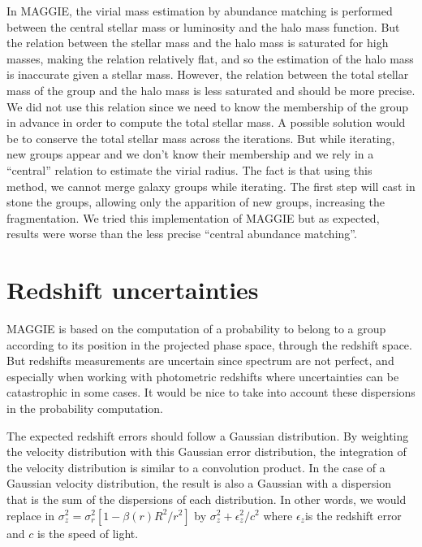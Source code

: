 In MAGGIE, the virial mass estimation by abundance matching is performed
between the central stellar mass or luminosity and the halo mass function. But
the relation between the stellar mass and the halo mass is saturated for high
masses, making the relation relatively flat, and so the estimation of the halo
mass is inaccurate given a stellar mass. However, the relation between the
total stellar mass of the group and the halo mass is less saturated and should
be more precise. We did not use this relation since we need to know the
membership of the group in advance in order to compute the total stellar mass.
A possible solution would be to conserve the total stellar mass across the
iterations. But while iterating, new groups appear and we don't know their
membership and we rely in a ``central'' relation to estimate the virial radius.
The fact is that using this method, we cannot merge galaxy groups while
iterating. The first step will cast in stone the groups, allowing only
the apparition of new groups, increasing the fragmentation. We tried this
implementation of MAGGIE but as expected, results were worse than the less
precise ``central abundance matching''.

\section{Redshift uncertainties}
\label{sec:redshift_uncertainties}

MAGGIE is based on the computation of a probability to belong to a group
according to its position in the projected phase space, through the redshift
space. But redshifts measurements are uncertain since spectrum are not perfect,
and especially when working with photometric redshifts where uncertainties can
be catastrophic in some cases. It would be nice to take into account these
dispersions in the probability computation.

The expected redshift errors should follow a Gaussian distribution. By
weighting the velocity distribution with this Gaussian error distribution, the
integration of the velocity distribution is similar to a convolution product.
In the case of a Gaussian velocity distribution, the result is also a Gaussian
with a dispersion that is the sum of the dispersions of each distribution. In
other words, we would replace in 
$\sigma_z^2 = \sigma_r^2 \left[1-\beta \left(r\right) R^2/r^2\right]$ by
$\sigma_z^2+\epsilon_z^2/c^2$ where $\epsilon_z$is the redshift error and $c$
is the speed of light.

